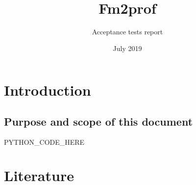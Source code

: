 \documentclass[signature]{deltares_report}
\begin{document}
\pagestyle{empty}
\cleardoublepage
%

\newcommand{\ProgramName}{Fm2prof\xspace}

\title{\ProgramName}
\subtitle{Acceptance tests report}
\classification{-}

\date{July 2019}


\summary{}

\revieweri{}
\approvali{}

\disclaimer{}

\deltarestitle


\chapter{Introduction} 
\label{chapterIntroduction}

\section{Purpose and scope of this document} \label{sec:PurposeAndScope}



PYTHON_CODE_HERE


\chapter{Literature}  \label{chapterLiterature}

\pagestyle{empty}
\mbox{}

\end{document}
